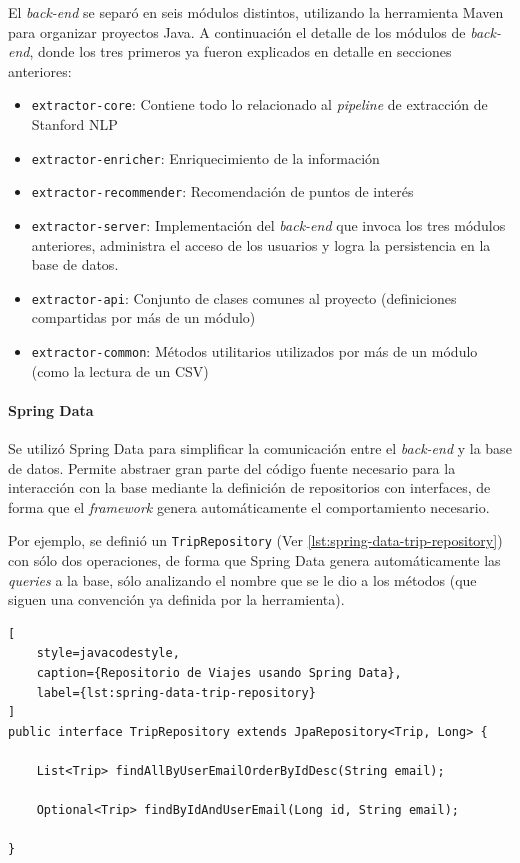 El \textit{back-end} se separó en seis módulos distintos, utilizando la herramienta Maven para organizar proyectos Java.
A continuación el detalle de los módulos de \textit{back-end}, donde los tres primeros ya fueron explicados en detalle
en secciones anteriores:

\begin{itemize}
    \item \texttt{extractor-core}: Contiene todo lo relacionado al \textit{pipeline} de extracción de Stanford NLP
    \item \texttt{extractor-enricher}: Enriquecimiento de la información
    \item \texttt{extractor-recommender}: Recomendación de puntos de interés
    \item \texttt{extractor-server}: Implementación del \textit{back-end} que invoca los tres módulos anteriores,
    administra el acceso de los usuarios y logra la persistencia en la base de datos.
    \item \texttt{extractor-api}: Conjunto de clases comunes al proyecto (definiciones compartidas por más de un módulo)
    \item \texttt{extractor-common}: Métodos utilitarios utilizados por más de un módulo (como la lectura de un CSV)
\end{itemize}

\paragraph{Spring Data}

Se utilizó Spring Data para simplificar la comunicación entre el \textit{back-end} y la base de datos.
Permite abstraer gran parte del código fuente necesario para la interacción con la base mediante la definición de
repositorios con interfaces, de forma que el \textit{framework} genera automáticamente el comportamiento necesario.

Por ejemplo, se definió un \texttt{TripRepository} (Ver \autoref{lst:spring-data-trip-repository}) con sólo dos
operaciones, de forma que Spring Data genera automáticamente las \textit{queries} a la base, sólo analizando el nombre
que se le dio a los métodos (que siguen una convención ya definida por la herramienta).

\begin{lstlisting}[
    style=javacodestyle,
    caption={Repositorio de Viajes usando Spring Data},
    label={lst:spring-data-trip-repository}
]
public interface TripRepository extends JpaRepository<Trip, Long> {

    List<Trip> findAllByUserEmailOrderByIdDesc(String email);

    Optional<Trip> findByIdAndUserEmail(Long id, String email);

}
\end{lstlisting}

